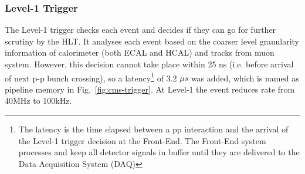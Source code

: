 {{{\subsubsection{Level-1 Trigger} %
\label{ssub:level_1_trigger}
The Level-1 trigger checks each event and decides if they can go for further scrutiny by the HLT. It analyses each event based on the coarser level granularity information of calorimeter (both ECAL and HCAL) and tracks from muon system. However, this decision cannot take place within 25 ns (i.e. before arrival of next p-p bunch crossing), so a latency\footnote{The latency is the time elapsed between a pp interaction and the arrival of the Level-1 trigger decision at the Front-End. The Front-End system processes and keep all detector signals in buffer until they are delivered to the Data Acquisition System (DAQ)} of 3.2 $\mu s$ was added, which is named as pipeline memory in Fig.~\ref{fig:cms-trigger}. At Level-1 the event reduces rate from 40MHz to 100kHz.

}}}
